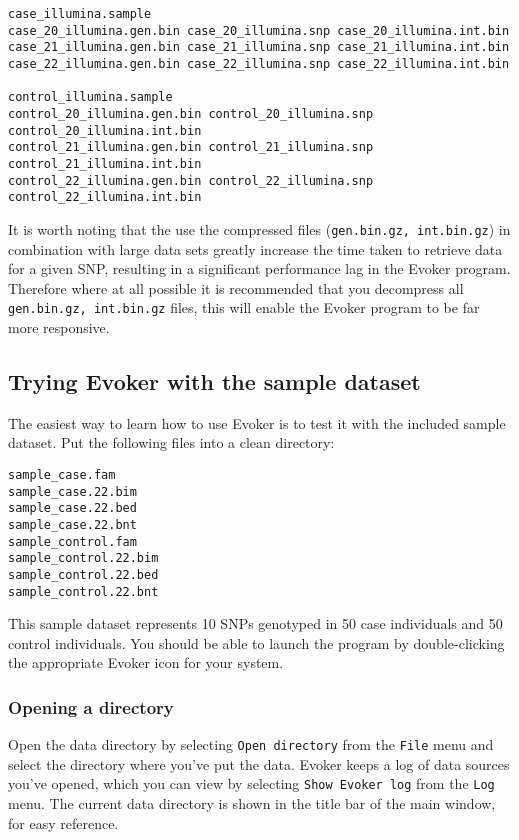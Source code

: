 \documentclass{article}
\begin{document}
\begin{verbatim}
case_illumina.sample
case_20_illumina.gen.bin case_20_illumina.snp case_20_illumina.int.bin 
case_21_illumina.gen.bin case_21_illumina.snp case_21_illumina.int.bin 
case_22_illumina.gen.bin case_22_illumina.snp case_22_illumina.int.bin

control_illumina.sample
control_20_illumina.gen.bin control_20_illumina.snp control_20_illumina.int.bin 
control_21_illumina.gen.bin control_21_illumina.snp control_21_illumina.int.bin 
control_22_illumina.gen.bin control_22_illumina.snp control_22_illumina.int.bin
\end{verbatim}

It is worth noting that the use the compressed files (\texttt{gen.bin.gz, int.bin.gz}) in combination with large data sets greatly increase the time taken to retrieve data for a given SNP, resulting in a significant performance lag in the Evoker program. Therefore where at all possible it is recommended that you decompress all \texttt{gen.bin.gz, int.bin.gz} files, this will enable the Evoker program to be far more responsive.

\subsection{Trying Evoker with the sample dataset}

The easiest way to learn how to use Evoker is to test it with the included sample dataset. Put the following files into a clean directory:

\begin{verbatim}
sample_case.fam
sample_case.22.bim
sample_case.22.bed
sample_case.22.bnt
sample_control.fam
sample_control.22.bim
sample_control.22.bed
sample_control.22.bnt
\end{verbatim}

This sample dataset represents 10 SNPs genotyped in 50 case individuals and 50 control individuals. You should be able to launch the program by double-clicking the appropriate Evoker icon for your system.

\subsubsection{Opening a directory}
Open the data directory by selecting \texttt{Open directory} from the \texttt{File} menu and select the directory where you've put the data. Evoker keeps a log of data sources you've opened, which you can view by selecting \texttt{Show Evoker log} from the \texttt{Log} menu. The current data directory is shown in the title bar of the main window, for easy reference.
\end{document}
